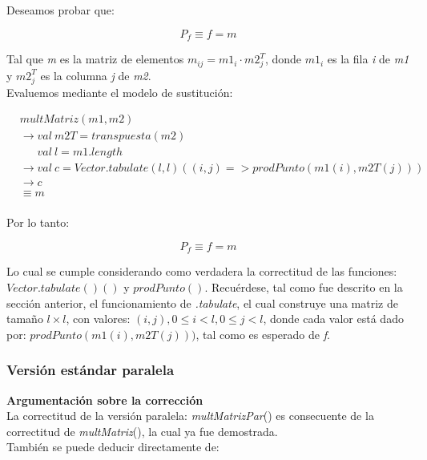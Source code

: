 \documentclass{article}
\begin{document}
Deseamos probar que:

\begin{equation*}
    P_f \equiv f = m
\end{equation*}

Tal que \textit{m} es la matriz de elementos \(m_{ij} = m1_{i} \cdot m2^T_{j}\), donde \(m1_{i}\) es la fila \textit{i} de \textit{m1} y \(m2^T_{j}\) es la columna \textit{j} de \textit{m2}.\\

Evaluemos mediante el modelo de sustitución:

\begin{align*}
    &multMatriz(m1, m2)\\
    &\rightarrow val \ m2T = transpuesta(m2)\\
    &\quad \; \; val \ l = m1.length\\
    &\rightarrow val \ c = Vector.tabulate(l, l)((i, j) => prodPunto(m1(i),m2T(j)))\\
    &\rightarrow c\\
    &\equiv m\\
\end{align*}

Por lo tanto: 

\begin{equation*}
    P_f \equiv f = m
\end{equation*}

Lo cual se cumple considerando como verdadera la correctitud de las funciones: \(Vector.tabulate()()\) y \(prodPunto()\). Recuérdese, tal como fue descrito en la sección anterior, el funcionamiento de \textit{.tabulate}, el cual construye una matriz de tamaño \(l \times l\), con valores: \((i,j), 0 \leq i < l, 0 \leq j < l\), donde cada valor está dado por: \(prodPunto(m1(i),m2T(j)))\), tal como es esperado de \textit{f}.\\

\subsubsection{Versión estándar paralela}

\textbf{Argumentación sobre la corrección}\\

La correctitud de la versión paralela: \textit{multMatrizPar}() es consecuente de la correctitud de \textit{multMatriz}(), la cual ya fue demostrada.\\

También se puede deducir directamente de:
\end{document}
